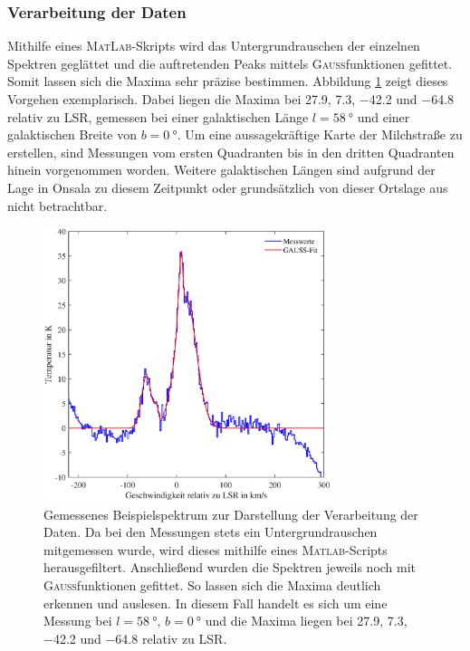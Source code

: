 \subsubsection{Verarbeitung der Daten}
Mithilfe eines \textsc{MatLab}-Skripts wird das Untergrundrauschen der einzelnen Spektren geglättet und die auftretenden Peaks mittels \textsc{Gauß}funktionen gefittet. 
Somit lassen sich die Maxima sehr präzise bestimmen. 
Abbildung \ref{fig:TestBaseline} zeigt dieses Vorgehen exemplarisch. 
Dabei liegen die Maxima bei \SI{27.9}{}, \SI{7.3}{}, \SI{-42.2}{} und \SI{-64.8}{} relativ zu LSR, gemessen bei einer galaktischen Länge $l = \SI{58}{\degree}$ und einer galaktischen Breite von $b = \SI{0}{\degree}$. 
Um eine aussagekräftige Karte der Milchstraße zu erstellen, sind Messungen vom ersten Quadranten bis in den dritten Quadranten hinein vorgenommen worden. Weitere galaktischen Längen sind aufgrund der Lage in Onsala zu diesem Zeitpunkt oder grundsätzlich von dieser Ortslage aus nicht betrachtbar.
\begin{figure}[H]
    \centering
    \includegraphics[width= 0.75\textwidth]{plots/TestBaseline.eps}
    \caption[Gemessenes Beispielspektrum zur Darstellung der Verarbeitung der Daten]{Gemessenes Beispielspektrum zur Darstellung der Verarbeitung der Daten. Da bei den Messungen stets ein Untergrundrauschen mitgemessen wurde, wird dieses mithilfe eines \textsc{Matlab}-Scripts herausgefiltert. Anschließend wurden die Spektren jeweils noch mit \textsc{Gauß}funktionen gefittet. So lassen sich die Maxima deutlich erkennen und auslesen. In diesem Fall handelt es sich um eine Messung bei $l = \SI{58}{\degree}, \, b = \SI{0}{\degree}$ und die Maxima liegen bei \SI{27.9}{}, \SI{7.3}{}, \SI{-42.2}{} und \SI{-64.8}{} relativ zu LSR.}
    \label{fig:TestBaseline}
\end{figure}
